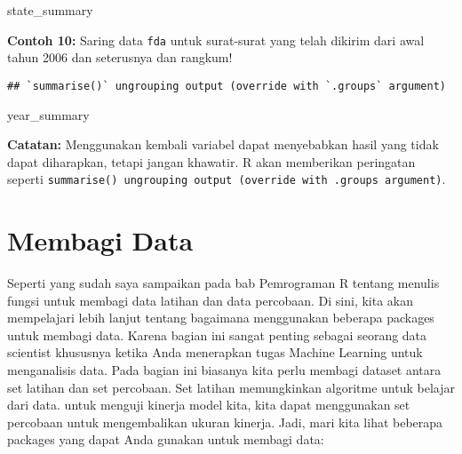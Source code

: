 \documentclass[
]{book}
\newenvironment{Shaded}{\begin{snugshade}}{\end{snugshade}}
\newcommand{\DataTypeTok}[1]{\textcolor[rgb]{0.13,0.29,0.53}{#1}}
\newcommand{\KeywordTok}[1]{\textcolor[rgb]{0.13,0.29,0.53}{\textbf{#1}}}
\newcommand{\NormalTok}[1]{#1}
\newcommand{\OperatorTok}[1]{\textcolor[rgb]{0.81,0.36,0.00}{\textbf{#1}}}
\newcommand{\StringTok}[1]{\textcolor[rgb]{0.31,0.60,0.02}{#1}}
\begin{document}
\begin{Shaded}
\begin{Highlighting}[]
\NormalTok{state_summary}
\end{Highlighting}
\end{Shaded}

\textbf{Contoh 10:} Saring data \texttt{fda} untuk surat-surat yang telah dikirim dari awal tahun 2006 dan seterusnya dan rangkum!

\begin{Shaded}
\end{Shaded}

\begin{verbatim}
## `summarise()` ungrouping output (override with `.groups` argument)
\end{verbatim}

\begin{Shaded}
\begin{Highlighting}[]
\NormalTok{year_summary}
\end{Highlighting}
\end{Shaded}

\textbf{Catatan:} Menggunakan kembali variabel dapat menyebabkan hasil yang tidak dapat diharapkan, tetapi jangan khawatir. R akan memberikan peringatan seperti \texttt{summarise()\ ungrouping\ output\ (override\ with\ .groups\ argument)}.

\hypertarget{membagi-data}{%
\section{Membagi Data}\label{membagi-data}}

Seperti yang sudah saya sampaikan pada bab Pemrograman R tentang menulis fungsi untuk membagi data latihan dan data percobaan. Di sini, kita akan mempelajari lebih lanjut tentang bagaimana menggunakan beberapa packages untuk membagi data. Karena bagian ini sangat penting sebagai seorang data scientist khususnya ketika Anda menerapkan tugas Machine Learning untuk menganalisis data. Pada bagian ini biasanya kita perlu membagi dataset antara set latihan dan set percobaan. Set latihan memungkinkan algoritme untuk belajar dari data. untuk menguji kinerja model kita, kita dapat menggunakan set percobaan untuk mengembalikan ukuran kinerja. Jadi, mari kita lihat beberapa packages yang dapat Anda gunakan untuk membagi data:
\end{document}
